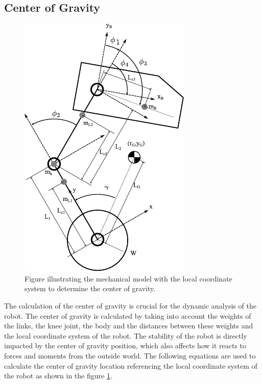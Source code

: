 \subsection{Center of Gravity }
%
%
%
%
	\begin{figure}[h]
		\centering
		\includegraphics[width=.5\textwidth]{Model}
		\caption[Mechanical model with the local coordinate system]{Figure illustrating the mechanical model with the local coordinate system to determine the center of gravity.}
		\label{fig:Mechanical model with the local coordinate system}
	\end{figure}

The calculation of the center of gravity is crucial for the dynamic analysis of the robot.
The center of gravity is calculated by taking into account the weights of the links, the knee joint, the body and the distances between these weights and the local coordinate system of the robot.
The stability of the robot is directly impacted by the center of gravity position, which also affects how it reacts to forces and moments from the outside world.
The following equations are used to calculate the center of gravity location referencing the local coordinate system of the robot as shown in the figure \ref{fig:Mechanical model with the local coordinate system}.



